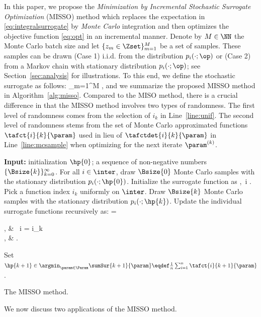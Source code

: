 \documentclass{article}
\begin{document}
In this paper, we propose the \emph{Minimization by Incremental Stochastic Surrogate Optimization} (MISSO) method  which replaces the expectation in \eqref{eq:integralsurrogate} by \emph{Monte Carlo} integration and then optimizes the objective function \eqref{eq:opt} in an incremental manner.
Denote by $M \in \NN$ the Monte Carlo batch size and let $\{z_m \in \Zset\}_{m=1}^M$ be a set of samples. These samples can be drawn
{\sf (Case 1)} i.i.d. from the distribution $p_i( \cdot ; \op )$ or {\sf (Case 2)}  from a Markov chain with stationary distribution $p_{i}(\cdot; \op)$; see Section~\ref{sec:analysis} for illustrations.
To this end, we define the stochastic surrogate as follows:
\beq \label{eq:ssur}  
 \eqdef {} \sum_{m=1}^{M} \eqsp,
\eeq
and we summarize the proposed MISSO method in Algorithm~\ref{alg:misso}. Compared to the MISO method, there is a crucial difference in that 
the MISSO method involves two types of randomness.  The first level of randomness comes from the selection of $i_k$ in Line~\ref{line:unif}. 
The second level of randomness stems from the set of Monte Carlo approximated functions $\tafct{i}{k}{\param}$ used in lieu of $\tafctdet{i}{k}{\param}$ in Line~\ref{line:mcsample} when optimizing for the next iterate $\param^{(k)}$.
\begin{algorithm}[t]
\begin{algorithmic}[1]
\STATE \textbf{Input:} initialization $\hp{0}$; a sequence of non-negative numbers $\{ \Bsize{k} \}_{k=0}^\infty$.
\STATE For all $i \in \inter$, draw $\Bsize{0}$ Monte Carlo samples with the stationary distribution $p_i(\cdot; \hp{0})$.
\STATE Initialize the surrogate function as
\beq\notag
{} \eqdef {},~i \in \inter \eqsp. \vspace{-.2cm}
\eeq
{}
\STATE \label{line:unif}Pick a function index $i_k$ uniformly on $\inter$.
\STATE \label{line:mcsample} Draw $\Bsize{k}$ Monte Carlo samples with the stationary distribution $p_i(\cdot; \hp{k})$.
\STATE \label{line:ssur} Update the individual surrogate functions recursively as:
\beq\notag
{} = \begin{cases}
, & ~i = i_k \\
, & .
\end{cases}
\eeq
\STATE \label{line:iter} Set $\hp{k+1} \in \argmin_{ \param \in \Param } \sumSur{k+1}{\param} \eqdef  \frac{1}{n} \sum_{i=1}^n \tafct{i}{k+1}{\param}$.
\ENDFOR
\end{algorithmic}
\caption{The MISSO method.}
\label{alg:misso}
        \end{algorithm}
We now discuss two applications of the MISSO method.
\end{document}
